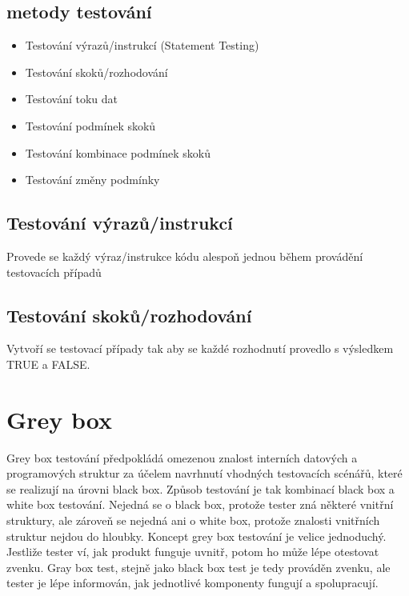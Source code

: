 \documentclass{article}
\begin{document}
\begin{large}
\subsection{metody testování}
\begin{itemize}
    \item Testování výrazů/instrukcí (Statement Testing)
    \item Testování skoků/rozhodování
    \item Testování toku dat
    \item Testování podmínek skoků
    \item Testování kombinace podmínek skoků
    \item Testování změny podmínky
\end{itemize}
\subsection{Testování výrazů/instrukcí}
Provede se každý výraz/instrukce kódu alespoň jednou během provádění testovacích případů
\subsection{Testování skoků/rozhodování}
Vytvoří se testovací případy tak aby se každé rozhodnutí provedlo s výsledkem TRUE a FALSE.
\section{Grey box}
Grey box testování předpokládá omezenou znalost interních datových a programových struktur za účelem navrhnutí vhodných testovacích scénářů, které se realizují na úrovni black box.
Způsob testování je tak kombinací black box a white box testování. Nejedná se o black box, protože tester zná některé vnitřní struktury, ale zároveň se nejedná ani o white box, protože znalosti vnitřních struktur nejdou do hloubky. Koncept grey box testování je velice jednoduchý. Jestliže tester ví, jak produkt funguje uvnitř, potom ho může lépe otestovat zvenku. Gray box test, stejně jako black box test je tedy prováděn zvenku, ale tester je lépe informován, jak jednotlivé komponenty fungují a spolupracují.

\end{large}
\end{document}
